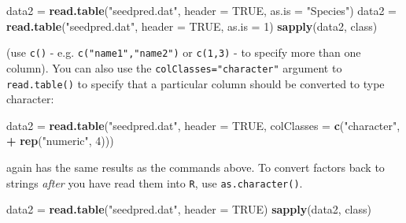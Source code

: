\documentclass[11pt,]{article}
\newenvironment{Shaded}{\begin{snugshade}}{\end{snugshade}}
\newcommand{\KeywordTok}[1]{\textcolor[rgb]{0.13,0.29,0.53}{\textbf{#1}}}
\newcommand{\DataTypeTok}[1]{\textcolor[rgb]{0.13,0.29,0.53}{#1}}
\newcommand{\DecValTok}[1]{\textcolor[rgb]{0.00,0.00,0.81}{#1}}
\newcommand{\StringTok}[1]{\textcolor[rgb]{0.31,0.60,0.02}{#1}}
\newcommand{\OtherTok}[1]{\textcolor[rgb]{0.56,0.35,0.01}{#1}}
\newcommand{\OperatorTok}[1]{\textcolor[rgb]{0.81,0.36,0.00}{\textbf{#1}}}
\newcommand{\NormalTok}[1]{#1}
\begin{document}
\begin{Shaded}
\begin{Highlighting}[]
\NormalTok{data2 =}\StringTok{ }\KeywordTok{read.table}\NormalTok{(}\StringTok{"seedpred.dat"}\NormalTok{, }\DataTypeTok{header =} \OtherTok{TRUE}\NormalTok{, }\DataTypeTok{as.is =} \StringTok{"Species"}\NormalTok{)}
\NormalTok{data2 =}\StringTok{ }\KeywordTok{read.table}\NormalTok{(}\StringTok{"seedpred.dat"}\NormalTok{, }\DataTypeTok{header =} \OtherTok{TRUE}\NormalTok{, }\DataTypeTok{as.is =} \DecValTok{1}\NormalTok{)}
\KeywordTok{sapply}\NormalTok{(data2, class)}
\end{Highlighting}
\end{Shaded}

(use \texttt{c()} - e.g. \texttt{c("name1","name2")} or \texttt{c(1,3)}
- to specify more than one column). You can also use the
\texttt{colClasses="character"} argument to \texttt{read.table()} to
specify that a particular column should be converted to type character:

\begin{Shaded}
\begin{Highlighting}[]
\NormalTok{data2 =}\StringTok{ }\KeywordTok{read.table}\NormalTok{(}\StringTok{"seedpred.dat"}\NormalTok{, }\DataTypeTok{header =} \OtherTok{TRUE}\NormalTok{, }\DataTypeTok{colClasses =} \KeywordTok{c}\NormalTok{(}\StringTok{"character"}\NormalTok{,}
\OperatorTok{+}\StringTok{ }\KeywordTok{rep}\NormalTok{(}\StringTok{"numeric"}\NormalTok{, }\DecValTok{4}\NormalTok{)))}
\end{Highlighting}
\end{Shaded}

again has the same results as the commands above. To convert factors
back to strings \emph{after} you have read them into \texttt{R}, use
\texttt{as.character()}.

\begin{Shaded}
\begin{Highlighting}[]
\NormalTok{data2 =}\StringTok{ }\KeywordTok{read.table}\NormalTok{(}\StringTok{"seedpred.dat"}\NormalTok{, }\DataTypeTok{header =} \OtherTok{TRUE}\NormalTok{)}
\KeywordTok{sapply}\NormalTok{(data2, class)}
\end{Highlighting}
\end{Shaded}

\begin{Shaded}
\end{Shaded}
\end{document}
